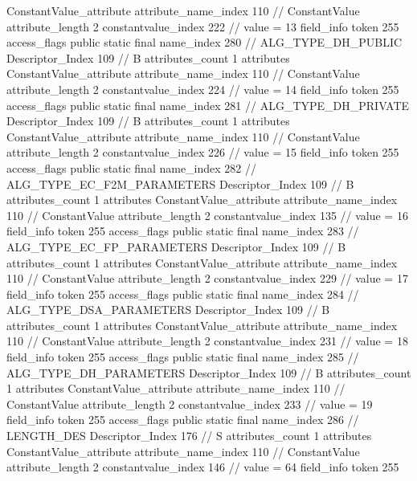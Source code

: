 {{{{{{				ConstantValue_attribute {
					attribute_name_index	110		// ConstantValue
					attribute_length	2
					constantvalue_index	222		// value = 13
				}
				}
			}
			field_info {
				token	255
				access_flags	public static final
				name_index	280		// ALG_TYPE_DH_PUBLIC
				Descriptor_Index	109		// B
				attributes_count	1
				attributes {
				ConstantValue_attribute {
					attribute_name_index	110		// ConstantValue
					attribute_length	2
					constantvalue_index	224		// value = 14
				}
				}
			}
			field_info {
				token	255
				access_flags	public static final
				name_index	281		// ALG_TYPE_DH_PRIVATE
				Descriptor_Index	109		// B
				attributes_count	1
				attributes {
				ConstantValue_attribute {
					attribute_name_index	110		// ConstantValue
					attribute_length	2
					constantvalue_index	226		// value = 15
				}
				}
			}
			field_info {
				token	255
				access_flags	public static final
				name_index	282		// ALG_TYPE_EC_F2M_PARAMETERS
				Descriptor_Index	109		// B
				attributes_count	1
				attributes {
				ConstantValue_attribute {
					attribute_name_index	110		// ConstantValue
					attribute_length	2
					constantvalue_index	135		// value = 16
				}
				}
			}
			field_info {
				token	255
				access_flags	public static final
				name_index	283		// ALG_TYPE_EC_FP_PARAMETERS
				Descriptor_Index	109		// B
				attributes_count	1
				attributes {
				ConstantValue_attribute {
					attribute_name_index	110		// ConstantValue
					attribute_length	2
					constantvalue_index	229		// value = 17
				}
				}
			}
			field_info {
				token	255
				access_flags	public static final
				name_index	284		// ALG_TYPE_DSA_PARAMETERS
				Descriptor_Index	109		// B
				attributes_count	1
				attributes {
				ConstantValue_attribute {
					attribute_name_index	110		// ConstantValue
					attribute_length	2
					constantvalue_index	231		// value = 18
				}
				}
			}
			field_info {
				token	255
				access_flags	public static final
				name_index	285		// ALG_TYPE_DH_PARAMETERS
				Descriptor_Index	109		// B
				attributes_count	1
				attributes {
				ConstantValue_attribute {
					attribute_name_index	110		// ConstantValue
					attribute_length	2
					constantvalue_index	233		// value = 19
				}
				}
			}
			field_info {
				token	255
				access_flags	public static final
				name_index	286		// LENGTH_DES
				Descriptor_Index	176		// S
				attributes_count	1
				attributes {
				ConstantValue_attribute {
					attribute_name_index	110		// ConstantValue
					attribute_length	2
					constantvalue_index	146		// value = 64
				}
				}
			}
			field_info {
				token	255
}}}}}
